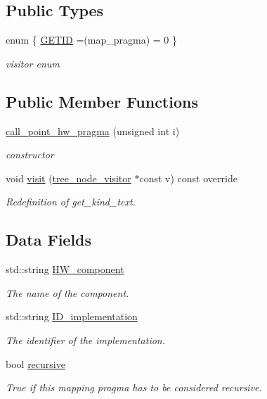 \subsection*{Public Types}
\begin{DoxyCompactItemize}
\item 
enum \{ \hyperlink{structcall__point__hw__pragma_a287df8d4c2186e6d94e3091ee02b54deaac08f04c6cf1e0d72239e536a75f5d23}{G\+E\+T\+ID} =(map\+\_\+pragma) = 0
 \}\begin{DoxyCompactList}\small\item\em visitor enum \end{DoxyCompactList}
\end{DoxyCompactItemize}
\subsection*{Public Member Functions}
\begin{DoxyCompactItemize}
\item 
\hyperlink{structcall__point__hw__pragma_af59bb17d60759b9e00ad5707e893b646}{call\+\_\+point\+\_\+hw\+\_\+pragma} (unsigned int i)
\begin{DoxyCompactList}\small\item\em constructor \end{DoxyCompactList}\item 
void \hyperlink{structcall__point__hw__pragma_a3c039efe1da66ca0ab6445535aaa6eb2}{visit} (\hyperlink{classtree__node__visitor}{tree\+\_\+node\+\_\+visitor} $\ast$const v) const override
\begin{DoxyCompactList}\small\item\em Redefinition of get\+\_\+kind\+\_\+text. \end{DoxyCompactList}\end{DoxyCompactItemize}
\subsection*{Data Fields}
\begin{DoxyCompactItemize}
\item 
std\+::string \hyperlink{structcall__point__hw__pragma_a3877fe6ff40d15bc39f0ca97d03626df}{H\+W\+\_\+component}
\begin{DoxyCompactList}\small\item\em The name of the component. \end{DoxyCompactList}\item 
std\+::string \hyperlink{structcall__point__hw__pragma_a1fe31464f943533938e61477478511ef}{I\+D\+\_\+implementation}
\begin{DoxyCompactList}\small\item\em The identifier of the implementation. \end{DoxyCompactList}\item 
bool \hyperlink{structcall__point__hw__pragma_ac96181a1ad7d294b231b7bfddc82f025}{recursive}
\begin{DoxyCompactList}\small\item\em True if this mapping pragma has to be considered recursive. \end{DoxyCompactList}\end{DoxyCompactItemize}

